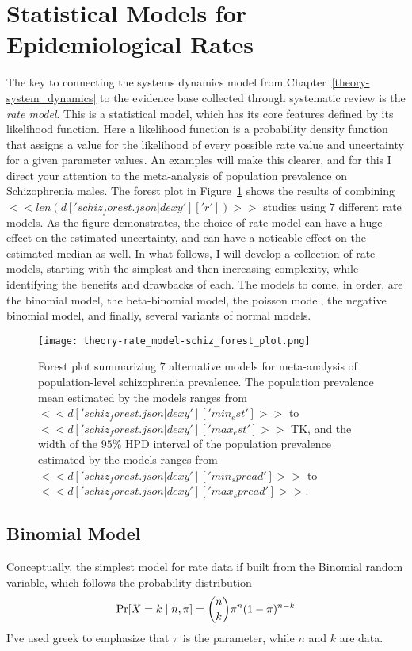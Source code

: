 \section{Statistical Models for Epidemiological Rates}
\label{theory-rate_model}

The key to connecting the systems dynamics model from
Chapter~\ref{theory-system_dynamics} to the evidence base collected
through systematic review is the \emph{rate model}.  This is a
statistical model, which has its core features defined by its
likelihood function.  Here a likelihood function is a probability
density function that assigns a value for the likelihood of every
possible rate value and uncertainty for a given parameter values.  An
examples will make this clearer, and for this I direct your attention
to the meta-analysis of population prevalence on Schizophrenia males.
The forest plot in Figure~\ref{fig:theory-rate_model-schiz_forest}
shows the results of combining $<<
len(d['schiz_forest.json|dexy']['r']) >>$ studies using $7$ different
rate models.  As the figure demonstrates, the choice of rate model can
have a huge effect on the estimated uncertainty, and can have a
noticable effect on the estimated median as well. In what follows, I
will develop a collection of rate models, starting with the simplest
and then increasing complexity, while identifying the benefits and
drawbacks of each.  The models to come, in order, are the binomial
model, the beta-binomial model, the poisson model, the negative
binomial model, and finally, several variants of normal models.

\begin{figure}
\begin{center}
\texttt{[image: theory-rate\_model-schiz\_forest\_plot.png]}
\end{center}
\caption{Forest plot summarizing $7$ alternative models for
  meta-analysis of population-level schizophrenia prevalence.  The
  population prevalence mean estimated by the models ranges from $<<
  d['schiz_forest.json|dexy']['min_est'] >>$ to $<<
  d['schiz_forest.json|dexy']['max_est'] >>$
  TK, and the width of the $95\%$ HPD interval of the population
  prevalence estimated by the models ranges from $<<
  d['schiz_forest.json|dexy']['min_spread'] >>$ to $<<
  d['schiz_forest.json|dexy']['max_spread'] >>$.}
\label{fig:theory-rate_model-schiz_forest}
\end{figure}

\subsection{Binomial Model}
Conceptually, the simplest model for rate data if built from the
Binomial random variable, which follows the probability distribution
\[
\operatorname{Pr}[X=k\;|\; n,\pi] = \binom{n}{k}\pi^n(1-\pi)^{n-k}
\]
I've used greek to emphasize that $\pi$ is the parameter, while $n$
and $k$ are data.

